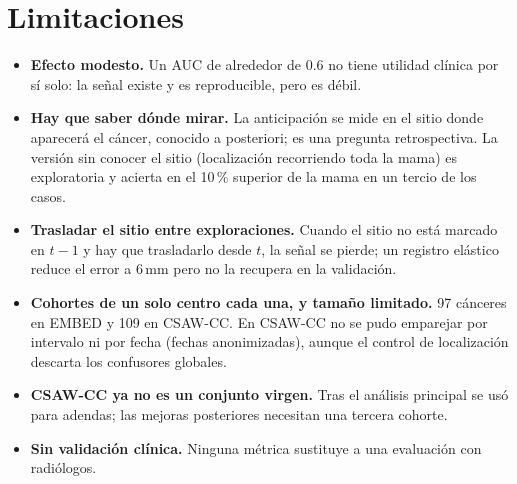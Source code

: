 \section{Limitaciones}
\begin{itemize}
  \item \textbf{Efecto modesto.} Un AUC de alrededor de $0.6$ no tiene
        utilidad clínica por sí solo: la señal existe y es reproducible,
        pero es débil.
  \item \textbf{Hay que saber dónde mirar.} La anticipación se mide en el
        sitio donde aparecerá el cáncer, conocido a posteriori; es una
        pregunta retrospectiva. La versión sin conocer el sitio
        (localización recorriendo toda la mama) es exploratoria y acierta
        en el 10\,\% superior de la mama en un tercio de los casos.
  \item \textbf{Trasladar el sitio entre exploraciones.} Cuando el sitio no
        está marcado en $t-1$ y hay que trasladarlo desde $t$, la señal se
        pierde; un registro elástico reduce el error a 6\,mm pero no la
        recupera en la validación.
  \item \textbf{Cohortes de un solo centro cada una, y tamaño limitado.} 97
        cánceres en EMBED y 109 en CSAW-CC. En CSAW-CC no se pudo emparejar
        por intervalo ni por fecha (fechas anonimizadas), aunque el control
        de localización descarta los confusores globales.
  \item \textbf{CSAW-CC ya no es un conjunto virgen.} Tras el análisis
        principal se usó para adendas; las mejoras posteriores necesitan
        una tercera cohorte.
  \item \textbf{Sin validación clínica.} Ninguna métrica sustituye a una
        evaluación con radiólogos.
\end{itemize}

